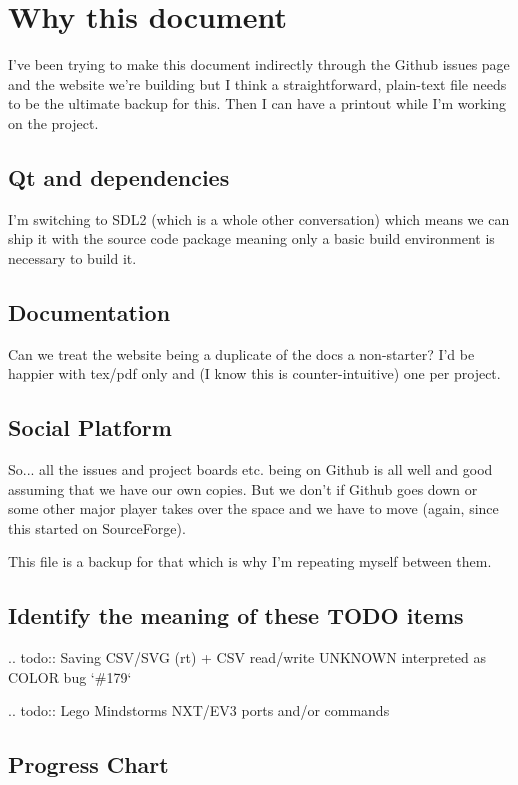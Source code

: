 \documentclass[10pt]{report}
\begin{document}
\section{Why this document}

I've been trying to make this document indirectly through the Github
issues page and the website we're building but I think a
straightforward, plain-text file needs to be the ultimate backup for
this. Then I can have a printout while I'm working on the project.

\subsection{Qt and dependencies}

I'm switching to SDL2 (which is a whole other conversation) which means
we can ship it with the source code package meaning only a basic build
environment is necessary to build it.

\subsection{Documentation}

Can we treat the website being a duplicate of the docs a non-starter?
I'd be happier with tex/pdf only and (I know this is counter-intuitive)
one per project.

\subsection{Social Platform}

So... all the issues and project boards etc. being on Github is all
well and good assuming that we have our own copies. But we don't if
Github goes down or some other major player takes over the space and we
have to move (again, since this started on SourceForge).

This file is a backup for that which is why I'm repeating myself between
them.

\subsection{Identify the meaning of these TODO items}

.. todo::
   Saving CSV/SVG (rt) + CSV read/write UNKNOWN interpreted as COLOR bug `\#179`

.. todo::
   Lego Mindstorms NXT/EV3 ports and/or commands

\subsection{Progress Chart}
\end{document}
